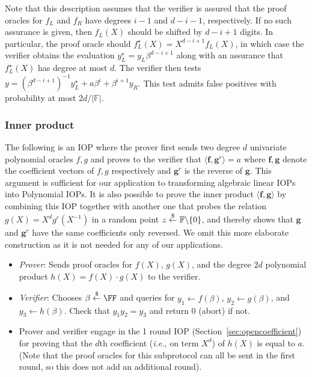 Note that this description assumes that the verifier is assured that the proof oracles for $f_L$ and $f_R$ have degrees $i-1$ and $d-i-1$, respectively. If no such assurance is given, then $f_L(X)$ should be shifted by $d-i+1$ digits. In particular, the proof oracle should $f_L^\star(X) = X^{d-i+1} f_L(X)$, in which case the verifier obtains the evaluation $y_L^\star = y_L \beta^{d-i+1}$ along with an assurance that $f_L^\star(X)$ has degree at most $d$. The verifier then tests $y = (\beta^{d-i+1})^{-1}y_L^\star + a \beta^i + \beta^{i+1} y_R$. This test admits false positives with probability at most $2d/|\mathbb{F}|$.
\fi

\subsubsection{Inner product}\label{sec:innerproduct}
The following is an IOP where the prover first sends two degree $d$ univariate polynomial oracles $f, g$ and proves to the verifier that $\langle \mathbf{f}, \mathbf{g}^r \rangle = a$ where $\mathbf{f}, \mathbf{g}$ denote the coefficient vectors of $f, g$ respectively and $\mathbf{g}^r$ is the reverse of $\mathbf{g}$. This argument is sufficient for our application to transforming algebraic linear IOPs into Polynomial IOPs. It is also possible to prove the inner product $\langle \mathbf{f}, \mathbf{g} \rangle$ by combining this IOP together with another one that probes the relation $g(X) = X^dg^r(X^{-1})$ in a random point $z \overset{\$}{\gets} \mathbb{F} \backslash \{0\}$, and thereby shows that $\mathbf{g}$ and $\mathbf{g}^r$ have the same coefficients only reversed. We omit this more elaborate construction as it is not needed for any of our applications.

\begin{itemize}
\item \emph{Prover}: Sends proof oracles for $f(X)$, $g(X)$, and the degree $2d$ polynomial product $h(X) = f(X)\cdot g(X)$ to the verifier. 
\item \emph{Verifier}: Chooses $\beta \sample \FF$ and queries for $y_1 \leftarrow f(\beta)$, $y_2 \leftarrow g(\beta)$, and $y_3 \leftarrow h(\beta)$. Check that $y_1 y_2 = y_3$ and return $0$ (abort) if not.
\item Prover and verifier engage in the 1 round IOP (Section~\ref{sec:opencoefficient}) for proving that the $d$th coefficient (\emph{i.e.}, on term $X^d$) of $h(X)$ is equal to $a$. (Note that the proof oracles for this subprotocol can all be sent in the first round, so this does not add an additional round). %
\end{itemize}

